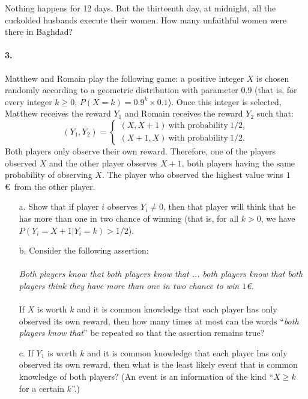 \documentclass[a4paper,notitlepage,12pt]{article}
\newcommand{\X}{X}
\newcommand{\Y}{Y}
\begin{document}
Nothing happens for 12 days. But the thirteenth day, at midnight, all the cuckolded husbands execute their women. How many unfaithful women were there in Baghdad?

\paragraph{3. } Matthew and Romain play the following game: a positive integer $\X$ is chosen randomly according to a geometric distribution with parameter $0.9$ (that is, for every integer $k \geq 0$, $P(\X = k) = 0.9 ^ k \times 0.1$). Once this integer is selected, Matthew receives the reward $\Y_1$ and Romain receives the reward $\Y_2$ such that:
\begin{equation*}
	(\Y_1, \Y_2) = 
	\begin{cases}
		(\X, \X+1) \ \text{with probability} \ 1/2, \\
		(\X+1, \X) \ \text{with probability} \ 1/2.
	\end{cases}
\end{equation*}
Both players only observe their own reward. Therefore, one of the players observed $\X$ and the other player observes $\X + 1$, both players having the same probability of observing $\X$. The player who observed the highest value wins $1$\euro \ from the other player.
\begin{itemize}
	\item[a.] Show that if player $i$ observes $\Y_i \neq 0$, then that player will think that he has more than one in two chance of winning (that is, for all $k > 0$, we have $P(\Y_i = \X+1 | \Y_i = k) > 1/2$).
	\item[b.] Consider the following assertion: \\
	\\
	\textit{Both players know that both players know that ... both players know that both players think they have more than one in two chance to win $1$\euro.} \\
	\\
	If $\X$ is worth $k$ and it is common knowledge that each player has only observed its own reward, then how many times at most can the words ``\textit{both players know that}'' be repeated so that the assertion remains true?
	\item[c.] If $\Y_1$ is worth $k$ and it is common knowledge that each player has only observed its own reward, then what is the least likely event that is common knowledge of both players? (An event is an information of the kind ``$\X \geq k$ for a certain $k$''.)
\end{itemize}
\end{document}
